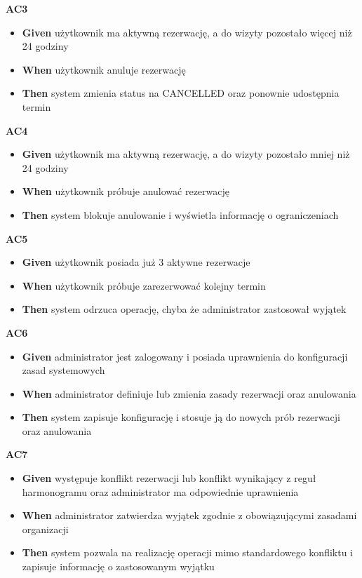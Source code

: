 \documentclass[12pt,a4paper]{article}
\begin{document}
\vspace{0.4em}
\textbf{AC3}
\begin{itemize}[itemsep=2pt]
  \item \textbf{Given} użytkownik ma aktywną rezerwację, a do wizyty pozostało więcej niż 24 godziny
  \item \textbf{When} użytkownik anuluje rezerwację
  \item \textbf{Then} system zmienia status na CANCELLED oraz ponownie udostępnia termin
\end{itemize}

\vspace{0.4em}
\textbf{AC4}
\begin{itemize}[itemsep=2pt]
  \item \textbf{Given} użytkownik ma aktywną rezerwację, a do wizyty pozostało mniej niż 24 godziny
  \item \textbf{When} użytkownik próbuje anulować rezerwację
  \item \textbf{Then} system blokuje anulowanie i wyświetla informację o ograniczeniach
\end{itemize}

\vspace{0.4em}
\textbf{AC5}
\begin{itemize}[itemsep=2pt]
  \item \textbf{Given} użytkownik posiada już 3 aktywne rezerwacje
  \item \textbf{When} użytkownik próbuje zarezerwować kolejny termin
  \item \textbf{Then} system odrzuca operację, chyba że administrator zastosował wyjątek
\end{itemize}

\vspace{0.4em}
\textbf{AC6}
\begin{itemize}[itemsep=2pt]
  \item \textbf{Given} administrator jest zalogowany i posiada uprawnienia do konfiguracji zasad systemowych
  \item \textbf{When} administrator definiuje lub zmienia zasady rezerwacji oraz anulowania
  \item \textbf{Then} system zapisuje konfigurację i stosuje ją do nowych prób rezerwacji oraz anulowania
\end{itemize}

\vspace{0.4em}
\textbf{AC7}
\begin{itemize}[itemsep=2pt]
  \item \textbf{Given} występuje konflikt rezerwacji lub konflikt wynikający z reguł harmonogramu oraz administrator ma odpowiednie uprawnienia
  \item \textbf{When} administrator zatwierdza wyjątek zgodnie z obowiązującymi zasadami organizacji
  \item \textbf{Then} system pozwala na realizację operacji mimo standardowego konfliktu i zapisuje informację o zastosowanym wyjątku
\end{itemize}
\end{document}
